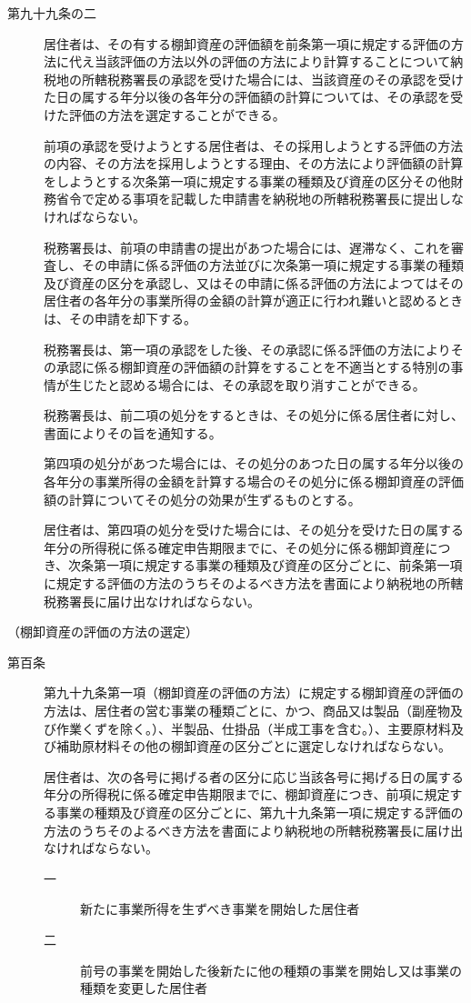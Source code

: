 \documentclass[twocolumn,a4j,10pt]{ltjtarticle}
\begin{document}
\begin{description}
\item[第九十九条の二]居住者は、その有する棚卸資産の評価額を前条第一項に規定する評価の方法に代え当該評価の方法以外の評価の方法により計算することについて納税地の所轄税務署長の承認を受けた場合には、当該資産のその承認を受けた日の属する年分以後の各年分の評価額の計算については、その承認を受けた評価の方法を選定することができる。
\item[]前項の承認を受けようとする居住者は、その採用しようとする評価の方法の内容、その方法を採用しようとする理由、その方法により評価額の計算をしようとする次条第一項に規定する事業の種類及び資産の区分その他財務省令で定める事項を記載した申請書を納税地の所轄税務署長に提出しなければならない。
\item[]税務署長は、前項の申請書の提出があつた場合には、遅滞なく、これを審査し、その申請に係る評価の方法並びに次条第一項に規定する事業の種類及び資産の区分を承認し、又はその申請に係る評価の方法によつてはその居住者の各年分の事業所得の金額の計算が適正に行われ難いと認めるときは、その申請を却下する。
\item[]税務署長は、第一項の承認をした後、その承認に係る評価の方法によりその承認に係る棚卸資産の評価額の計算をすることを不適当とする特別の事情が生じたと認める場合には、その承認を取り消すことができる。
\item[]税務署長は、前二項の処分をするときは、その処分に係る居住者に対し、書面によりその旨を通知する。
\item[]第四項の処分があつた場合には、その処分のあつた日の属する年分以後の各年分の事業所得の金額を計算する場合のその処分に係る棚卸資産の評価額の計算についてその処分の効果が生ずるものとする。
\item[]居住者は、第四項の処分を受けた場合には、その処分を受けた日の属する年分の所得税に係る確定申告期限までに、その処分に係る棚卸資産につき、次条第一項に規定する事業の種類及び資産の区分ごとに、前条第一項に規定する評価の方法のうちそのよるべき方法を書面により納税地の所轄税務署長に届け出なければならない。
\end{description}
\noindent\hspace{10pt}（棚卸資産の評価の方法の選定）
\begin{description}
\item[第百条]第九十九条第一項（棚卸資産の評価の方法）に規定する棚卸資産の評価の方法は、居住者の営む事業の種類ごとに、かつ、商品又は製品（副産物及び作業くずを除く。）、半製品、仕掛品（半成工事を含む。）、主要原材料及び補助原材料その他の棚卸資産の区分ごとに選定しなければならない。
\item[]居住者は、次の各号に掲げる者の区分に応じ当該各号に掲げる日の属する年分の所得税に係る確定申告期限までに、棚卸資産につき、前項に規定する事業の種類及び資産の区分ごとに、第九十九条第一項に規定する評価の方法のうちそのよるべき方法を書面により納税地の所轄税務署長に届け出なければならない。
\begin{description}
\item[一]新たに事業所得を生ずべき事業を開始した居住者
\item[二]前号の事業を開始した後新たに他の種類の事業を開始し又は事業の種類を変更した居住者
\end{description}
\end{description}
\end{document}
